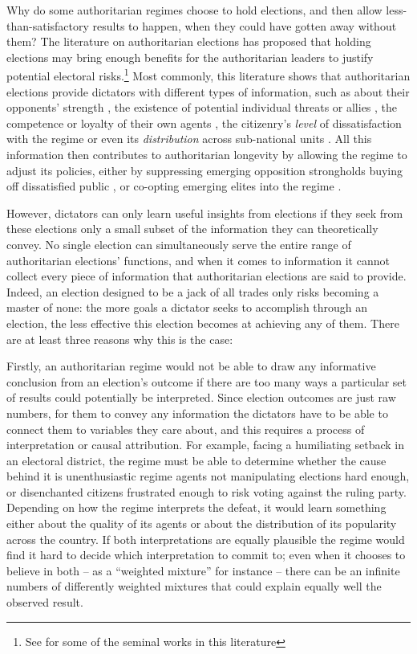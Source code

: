 \documentclass[12pt]{article}
\newcommand{\1}{\mathbbm{1}}
\begin{document}
Why do some authoritarian regimes choose to hold elections, and then allow less-than-satisfactory results to happen, when they could have gotten away without them? The literature on authoritarian elections has proposed that holding elections may bring enough benefits for the authoritarian leaders to justify potential electoral risks.\footnote{See \citet{Geddes2005, LustOkar2005, AR2005, Magaloni2006, Blaydes2008, Miller2015, Cox2009} for some of the seminal works in this literature} Most commonly, this literature shows that authoritarian elections provide dictators with different types of information, such as about their opponents' strength \citep{Geddes2005}, the existence of potential individual threats or allies \citep{LustOkar2005}, the competence or loyalty of their own agents \citep{Magaloni2006, Blaydes2008, Myagkov2009, RundlettSvolik2016}, the citizenry's \textit{level} of dissatisfaction with the regime \citep{Miller2015} or even its \textit{distribution} across sub-national units \citep{Magaloni2006, Blaydes2008}. All this information then contributes to authoritarian longevity by allowing the regime to adjust its policies, either by suppressing emerging opposition strongholds \citep{Magaloni2006, Blaydes2008} buying off dissatisfied public \citep{Miller2015, Magaloni2006}, or co-opting emerging elites into the regime \citep{LustOkar2005}.

However, dictators can only learn useful insights from elections if they seek from these elections only a small subset of the information they can theoretically convey. No single election can simultaneously serve the entire range of authoritarian elections' functions, and when it comes to information it cannot collect every piece of information that authoritarian elections are said to provide. Indeed, an election designed to be a jack of all trades only risks becoming a master of none: the more goals a dictator seeks to accomplish through an election, the less effective this election becomes at achieving any of them. There are at least three reasons why this is the case:

Firstly, an authoritarian regime would not be able to draw any informative conclusion from an election's outcome if there are too many ways a particular set of results could potentially be interpreted. Since election outcomes are just raw numbers, for them to convey any information the dictators have to be able to connect them to variables they care about, and this requires a process of interpretation or causal attribution. For example, facing a humiliating setback in an electoral district, the regime must be able to determine whether the cause behind it is unenthusiastic regime agents not manipulating elections hard enough, or disenchanted citizens frustrated enough to risk voting against the ruling party. Depending on how the regime interprets the defeat, it would learn something either about the quality of its agents or about the distribution of its popularity across the country. If both interpretations are equally plausible the regime would find it hard to decide which interpretation to commit to; even when it chooses to believe in both -- as a ``weighted mixture'' for instance -- there can be an infinite numbers of differently weighted mixtures that could explain equally well the observed result. 
\end{document}
